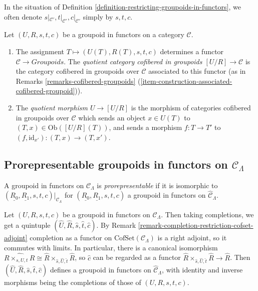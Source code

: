 \begin{remark}
\label{remark-notation-restriction}
In the situation of Definition 
\ref{definition-restricting-groupoids-in-functors}, we often denote 
$s|_{\mathcal{C}'},t|_{\mathcal{C}'},c|_{\mathcal{C}'}$ simply by $s,t,c$.
\end{remark}

\begin{definition}
\label{definition-quotient}
Let $(U,R,s,t,c)$ be a groupoid in functors on a category $\mathcal{C}$. 
\begin{enumerate}
\item The assignment $T \mapsto  (U(T), R(T), s,t,c)$ determines a functor 
$\mathcal{C} \to \textit{Groupoids}$. The {\it quotient category 
cofibered in groupoids $[U/R] \to \mathcal{C}$} is the category 
cofibered in groupoids over $\mathcal{C}$ associated to this functor (as in 
Remarks \ref{remarks-cofibered-groupoids} 
(\ref{item-construction-associated-cofibered-groupoid})).  
\item The {\it quotient morphism $U \to [U/R]$} is the morphism of 
categories cofibered in groupoids over $\mathcal{C}$ which sends an object $x 
\in U(T)$ to $(T,x) \in \text{Ob}([U/R](T))$, and sends a morphism $f: T 
\to T'$ to $(f, \text{id}_{x'}): (T,x) \to (T,x')$.
\end{enumerate} 
\end{definition}




\subsection{Prorepresentable groupoids in functors on $\mathcal{C}_\Lambda$}
\label{subsection-prerepresentable-groupoids-in-functors}

\begin{definition}
\label{definition-prorepresentable-groupoid-in-functors}
A groupoid in functors on $\mathcal{C}_\Lambda$ is {\it prorepresentable} if 
it is isomorphic to $(\underline{R_0}, \underline{R_1}, s,t,c)|_{\mathcal 
C_\Lambda}$ for $(\underline{R_0}, \underline{R_1}, s,t,c)$ a groupoid in 
functors on $\widehat{\mathcal{C}}_\Lambda$.
\end{definition}

\noindent
Let $(U,R,s,t,c)$ be a groupoid in functors on $\mathcal{C}_\Lambda$.  Then 
taking completions, we get a quintuple $(\widehat{U}, \widehat{R}, \widehat{s}, 
\widehat{t}, \widehat{c})$.  By Remark 
\ref{remark-completion-restriction-cofset-adjoint} completion as a functor on 
$\text{CofSet}(\mathcal{C}_\Lambda)$ is a right adjoint, so it commutes 
with limits.  In particular, there is a canonical isomorphism $\widehat{R 
\times_{s,U,t} R} \cong \widehat{R} \times_{\widehat{s}, \widehat{U}, 
\widehat{t}} \widehat{R}$, so $\widehat{c}$ can be regarded as a functor 
$\widehat{R} \times_{\widehat{s}, \widehat{U}, \widehat{t}} \widehat{R} 
\to \widehat{R}$.  Then $(\widehat{U}, \widehat{R}, \widehat{s}, 
\widehat{t}, \widehat{c})$ defines a groupoid in functors on $\widehat{\mathcal 
C}_\Lambda$, with identity and inverse morphisms being the completions of 
those of $(U,R,s,t,c)$.

